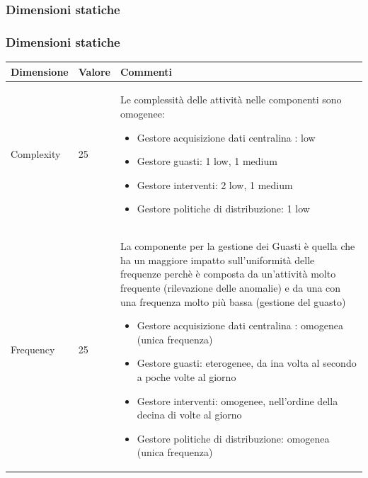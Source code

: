 \documentclass{beamer}
\begin{document}
	\subsubsection{Dimensioni statiche}
		\begin{frame}[allowframebreaks]
		\frametitle{Dimensioni statiche}			
		\begin{center}
			\begin{table}
				\tiny
				\centering
				{\renewcommand{\arraystretch}{1.2}
					
					\begin{tabular}{|M{0.1\textwidth}|M{0.1\textwidth}|p{.6\textwidth}|}
						\hline
						Dimensione & Valore & Commenti \\
						\hline
						Complexity & 25 & Le complessità delle attività nelle componenti sono omogenee:
						\begin{itemize}
								\item Gestore acquisizione dati centralina : low
								\item Gestore guasti: 1 low, 1 medium
								\item Gestore interventi: 2 low, 1 medium
								\item Gestore politiche di distribuzione: 1 low
						\end{itemize} \\
						Frequency & 25 & La componente per la gestione dei Guasti è quella che ha un maggiore impatto sull'uniformità delle frequenze perchè è composta da un'attività molto frequente (rilevazione delle anomalie) e da una con una frequenza molto più bassa (gestione del guasto)
						\begin{itemize}
							\item Gestore acquisizione dati centralina : omogenea (unica frequenza)
							\item Gestore guasti: eterogenee, da ina volta al secondo a poche volte al giorno
							\item Gestore interventi: omogenee, nell'ordine della decina di volte al giorno
							\item Gestore politiche di distribuzione:  omogenea (unica frequenza)
						\end{itemize} \\
						\hline
				\end{tabular}}
			\end{table}
		\end{center}
	

\end{frame}
\end{document}
